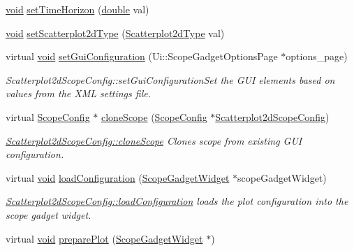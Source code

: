 \begin{DoxyCompactItemize}
\hyperlink{group___u_a_v_objects_plugin_ga444cf2ff3f0ecbe028adce838d373f5c}{void} \hyperlink{group___scope_plugin_gaecbec1456088d121dbf2b9f63a45c6ab}{set\-Time\-Horizon} (\hyperlink{_super_l_u_support_8h_a8956b2b9f49bf918deed98379d159ca7}{double} val)
\item 
\hyperlink{group___u_a_v_objects_plugin_ga444cf2ff3f0ecbe028adce838d373f5c}{void} \hyperlink{group___scope_plugin_ga67790b6de2598e4ff9f2d585fee11d09}{set\-Scatterplot2d\-Type} (\hyperlink{group___scope_plugin_gac3cffd2a84d02f4ebfba6df970d03e97}{Scatterplot2d\-Type} val)
\item 
virtual \hyperlink{group___u_a_v_objects_plugin_ga444cf2ff3f0ecbe028adce838d373f5c}{void} \hyperlink{group___scope_plugin_gafe1bd9bbdc9859af7a5d0ad561172a16}{set\-Gui\-Configuration} (Ui\-::\-Scope\-Gadget\-Options\-Page $\ast$options\-\_\-page)
\begin{DoxyCompactList}\small\item\em Scatterplot2d\-Scope\-Config\-::set\-Gui\-Configuration\-Set the G\-U\-I elements based on values from the X\-M\-L settings file. \end{DoxyCompactList}\item 
virtual \hyperlink{class_scope_config}{Scope\-Config} $\ast$ \hyperlink{group___scope_plugin_ga71ae0bb572870f67432575772c3093f8}{clone\-Scope} (\hyperlink{class_scope_config}{Scope\-Config} $\ast$\hyperlink{class_scatterplot2d_scope_config}{Scatterplot2d\-Scope\-Config})
\begin{DoxyCompactList}\small\item\em \hyperlink{group___scope_plugin_ga71ae0bb572870f67432575772c3093f8}{Scatterplot2d\-Scope\-Config\-::clone\-Scope} Clones scope from existing G\-U\-I configuration. \end{DoxyCompactList}\item 
virtual \hyperlink{group___u_a_v_objects_plugin_ga444cf2ff3f0ecbe028adce838d373f5c}{void} \hyperlink{group___scope_plugin_ga33b7752470b6c5d32b9aaf1b95faf0f7}{load\-Configuration} (\hyperlink{class_scope_gadget_widget}{Scope\-Gadget\-Widget} $\ast$scope\-Gadget\-Widget)
\begin{DoxyCompactList}\small\item\em \hyperlink{group___scope_plugin_ga33b7752470b6c5d32b9aaf1b95faf0f7}{Scatterplot2d\-Scope\-Config\-::load\-Configuration} loads the plot configuration into the scope gadget widget. \end{DoxyCompactList}\item 
virtual \hyperlink{group___u_a_v_objects_plugin_ga444cf2ff3f0ecbe028adce838d373f5c}{void} \hyperlink{group___scope_plugin_ga7ff8815549e33c472a7ada6080401b38}{prepare\-Plot} (\hyperlink{class_scope_gadget_widget}{Scope\-Gadget\-Widget} $\ast$)

\end{DoxyCompactItemize}
